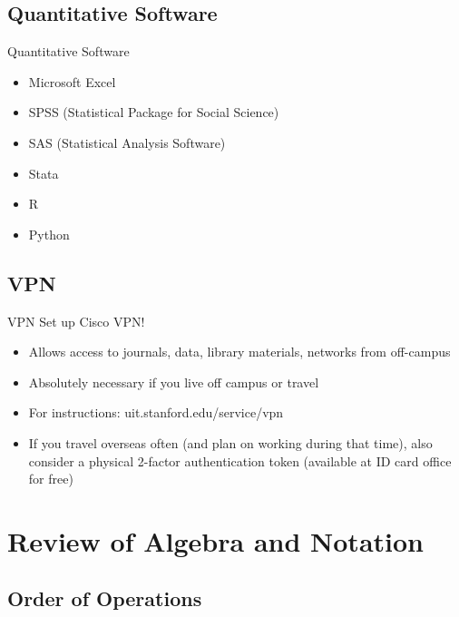 \documentclass[]{beamer}
\begin{document}
    \subsection{Quantitative Software}

    \begin{frame}{Quantitative Software}
        \begin{itemize}
            \item<2-> Microsoft Excel
            \item<3-> SPSS (Statistical Package for Social Science) 
            \item<4-> SAS (Statistical Analysis Software)
            \item<5-> Stata
            \item<6-> R
            \item<7-> Python
        \end{itemize}
    \end{frame}

    \subsection{VPN}

    \begin{frame}{VPN}
        Set up Cisco VPN!
        \begin{itemize}
            \item<2-> Allows access to journals, data, library materials, networks from off-campus
            \item<3-> Absolutely necessary if you live off campus or travel
            \item<4-> For instructions: uit.stanford.edu/service/vpn
            \item<5-> If you travel overseas often (and plan on working during that time), also consider a physical 2-factor authentication token (available at ID card office for free)
        \end{itemize}
   \end{frame}

\section{Review of Algebra and Notation}

    \subsection{Order of Operations}
\end{document}
